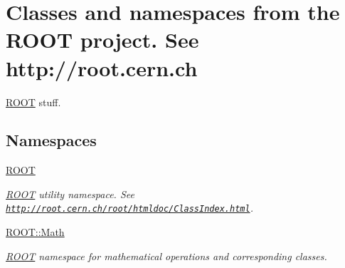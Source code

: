 \hypertarget{group___r_o_o_t}{}\section{Classes and namespaces from the R\+O\+OT project. See http\+://root.cern.\+ch}
\label{group___r_o_o_t}


\hyperlink{namespace_r_o_o_t}{R\+O\+OT} stuff.  


\subsection*{Namespaces}
\begin{DoxyCompactItemize}
\item 
 \hyperlink{namespace_r_o_o_t}{R\+O\+OT}
\begin{DoxyCompactList}\small\item\em \hyperlink{namespace_r_o_o_t}{R\+O\+OT} utility namespace. See \href{http://root.cern.ch/root/htmldoc/ClassIndex.html}{\tt http\+://root.\+cern.\+ch/root/htmldoc/\+Class\+Index.\+html}. \end{DoxyCompactList}\item 
 \hyperlink{namespace_r_o_o_t_1_1_math}{R\+O\+O\+T\+::\+Math}
\begin{DoxyCompactList}\small\item\em \hyperlink{namespace_r_o_o_t}{R\+O\+OT} namespace for mathematical operations and corresponding classes. \end{DoxyCompactList}\end{DoxyCompactItemize}
